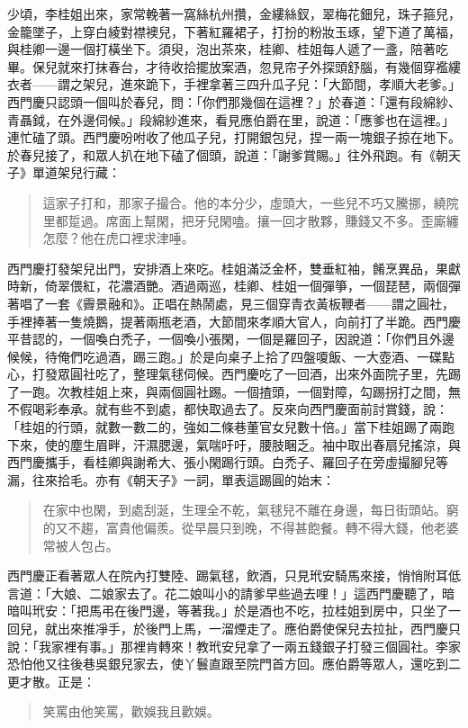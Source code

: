 少頃，李桂姐出來，家常輓著一窩絲杭州攢，金縷絲釵，翠梅花鈿兒，珠子箍兒，金籠墜子，上穿白綾對襟襖兒，下著紅羅裙子，打扮的粉妝玉琢，望下道了萬福，與桂卿一邊一個打橫坐下。須臾，泡出茶來，桂卿、桂姐每人遞了一盞，陪著吃畢。保兒就來打抹春台，才待收拾擺放案酒，忽見帘子外探頭舒腦，有幾個穿襤縷衣者——謂之架兒，進來跪下，手裡拿著三四升瓜子兒：「大節間，孝順大老爹。」西門慶只認頭一個叫於春兒，問：「你們那幾個在這裡？」於春道：「還有段綿紗、青聶鉞，在外邊伺候。」段綿紗進來，看見應伯爵在里，說道：「應爹也在這裡。」連忙磕了頭。西門慶吩咐收了他瓜子兒，打開銀包兒，捏一兩一塊銀子掠在地下。於春兒接了，和眾人扒在地下磕了個頭，說道：「謝爹賞賜。」往外飛跑。有《朝天子》單道架兒行藏：
\begin{quote}
這家子打和，那家子撮合。他的本分少，虛頭大，一些兒不巧又騰挪，繞院里都踅過。席面上幫閑，把牙兒閑嗑。攘一回才散夥，賺錢又不多。歪廝纏怎麼？他在虎口裡求津唾。
\end{quote}

西門慶打發架兒出門，安排酒上來吃。桂姐滿泛金杯，雙垂紅袖，餚烹異品，果獻時新，倚翠偎紅，花濃酒艷。酒過兩巡，桂卿、桂姐一個彈箏，一個琵琶，兩個彈著唱了一套《霽景融和》。正唱在熱鬧處，見三個穿青衣黃板鞭者——謂之圓社，手裡捧著一隻燒鵝，提著兩瓶老酒，大節間來孝順大官人，向前打了半跪。西門慶平昔認的，一個喚白禿子，一個喚小張閑，一個是羅回子，因說道：「你們且外邊候候，待俺們吃過酒，踢三跑。」於是向桌子上拾了四盤嗄飯、一大壺酒、一碟點心，打發眾圓社吃了，整理氣毬伺候。西門慶吃了一回酒，出來外面院子里，先踢了一跑。次教桂姐上來，與兩個圓社踢。一個揸頭，一個對障，勾踢拐打之間，無不假喝彩奉承。就有些不到處，都快取過去了。反來向西門慶面前討賞錢，說：「桂姐的行頭，就數一數二的，強如二條巷董官女兒數十倍。」當下桂姐踢了兩跑下來，使的塵生眉畔，汗濕腮邊，氣喘吁吁，腰肢睏乏。袖中取出春扇兒搖涼，與西門慶攜手，看桂卿與謝希大、張小閑踢行頭。白禿子、羅回子在旁虛撮腳兒等漏，往來拾毛。亦有《朝天子》一詞，單表這踢圓的始末：
\begin{quote}
在家中也閑，到處刮涎，生理全不乾，氣毬兒不離在身邊，每日街頭站。窮的又不趨，富貴他偏羨。從早晨只到晚，不得甚飽餐。轉不得大錢，他老婆常被人包占。
\end{quote}

西門慶正看著眾人在院內打雙陸、踢氣毬，飲酒，只見玳安騎馬來接，悄悄附耳低言道：「大娘、二娘家去了。花二娘叫小的請爹早些過去哩！」這西門慶聽了，暗暗叫玳安：「把馬弔在後門邊，等著我。」於是酒也不吃，拉桂姐到房中，只坐了一回兒，就出來推凈手，於後門上馬，一溜煙走了。應伯爵使保兒去拉扯，西門慶只說：「我家裡有事。」那裡肯轉來！教玳安兒拿了一兩五錢銀子打發三個圓社。李家恐怕他又往後巷吳銀兒家去，使丫鬟直跟至院門首方回。應伯爵等眾人，還吃到二更才散。正是：
\begin{quote}
笑罵由他笑罵，歡娛我且歡娛。
\end{quote}
